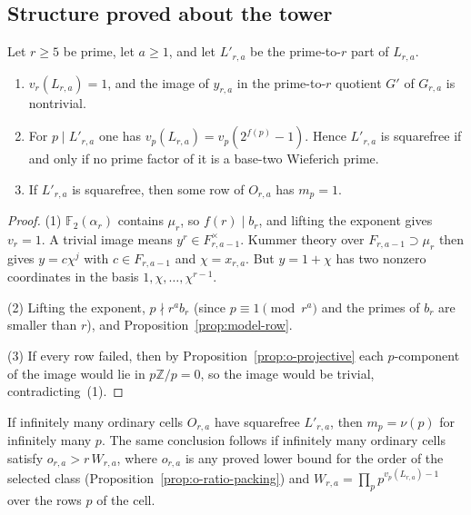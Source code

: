 \subsection{Structure proved about the tower}\label{sec:model-structure}

\begin{lemma}\label{lem:model-cell}
Let $r\geq5$ be prime, let $a\geq1$, and let $L'_{r,a}$ be the prime-to-$r$
part of $L_{r,a}$.
\begin{enumerate}
\item $v_r(L_{r,a})=1$, and the image of $y_{r,a}$ in the prime-to-$r$
      quotient $G'$ of $G_{r,a}$ is nontrivial.
\item For $p\mid L'_{r,a}$ one has $v_p(L_{r,a})=v_p(2^{f(p)}-1)$.  Hence
      $L'_{r,a}$ is squarefree if and only if no prime factor of it is a
      base-two Wieferich prime.
\item If $L'_{r,a}$ is squarefree, then some row of $O_{r,a}$ has
      $m_p=1$.
\end{enumerate}
\end{lemma}

\begin{proof}
(1) $\mathbb F_2(\alpha_r)$ contains $\mu_r$, so $f(r)\mid b_r$, and lifting
the exponent gives $v_r=1$.  A trivial image means
$y^r\in F_{r,a-1}^{\times}$.  Kummer theory over $F_{r,a-1}\supset\mu_r$ then
gives $y=c\chi^j$ with $c\in F_{r,a-1}$ and $\chi=x_{r,a}$.  But $y=1+\chi$
has two nonzero coordinates in the basis $1,\chi,\dots,\chi^{r-1}$.

(2) Lifting the exponent, $p\nmid r^ab_r$ (since $p\equiv1\pmod{r^a}$ and the
primes of $b_r$ are smaller than $r$), and
Proposition~\ref{prop:model-row}.

(3) If every row failed, then by Proposition~\ref{prop:o-projective} each
$p$-component of the image would lie in $p\mathbb Z/p=0$, so the image
would be trivial, contradicting~(1).
\end{proof}

\begin{corollary}
\label{cor:model-successes}
If infinitely many ordinary cells $O_{r,a}$ have squarefree $L'_{r,a}$, then
$m_p=\nu(p)$ for infinitely many $p$.  The same conclusion follows if
infinitely many ordinary cells satisfy $o_{r,a}>r\,W_{r,a}$, where
$o_{r,a}$ is any proved lower bound for the order of the selected class
(Proposition~\ref{prop:o-ratio-packing}) and
$W_{r,a}=\prod_pp^{v_p(L_{r,a})-1}$ over the rows $p$ of the cell.
\end{corollary}

